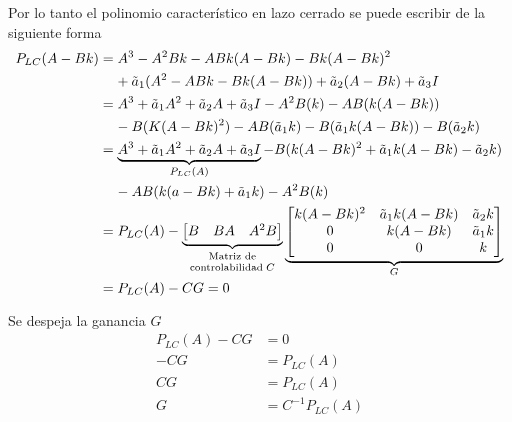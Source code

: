 Por lo tanto el polinomio característico en lazo cerrado se puede escribir de la siguiente forma
\[
    \begin{split}
            P_{LC}(A-Bk) & = A^{3} - A^{2}Bk - ABk(A-Bk) - Bk(A-Bk)^{2} \\ & \;\;\;\; + \tilde{a}_{1}( A^{2} - ABk - Bk(A-Bk) ) + \tilde{a}_{2}(A-Bk) + \tilde{a}_{3}I \\
            & = A^{3} + \tilde{a}_{1}A^{2} + \tilde{a}_{2}A + \tilde{a}_{3}I - A^{2}B(k) - AB(k(A-Bk)) \\
            & \;\;\;\; - B(K(A-Bk)^{2}) - AB(\tilde{a}_{1}k) - B(\tilde{a}_{1}k(A-Bk)) - B(\tilde{a}_{2}k) \\
            & = \underbrace{A^{3} + \tilde{a}_{1}A^{2} + \tilde{a}_{2}A + \tilde{a}_{3}I}_{ P_{LC}(A) } - B(k(A-Bk)^{2}+\tilde{a}_{1}k(A-Bk) - \tilde{a}_{2}k) \\ & \;\;\;\; - AB(k(a-Bk) + \tilde{a}_{1}k) - A^{2}B(k) \\
            & = P_{LC}(A) - 
            \underbrace{
                \begin{bmatrix}
                    B & BA & A^{2}B
                \end{bmatrix} 
                        }_
                        {
                        \begin{scriptsize}
                            \begin{matrix}
                                \text{Matriz de} \\
                                \text{controlabilidad} \; C
                            \end{matrix}
                        \end{scriptsize}
                        }
            \underbrace{
                \begin{bmatrix}
                    k(A-Bk)^{2} & \tilde{a}_{1}k(A-Bk) & \tilde{a}_{2}k \\
                    0 & k(A-Bk) & \tilde{a}_{1}k \\
                    0 & 0 & k
                \end{bmatrix}
                        }_{G} \\
            & = P_{LC}(A) - CG = 0
    \end{split}
\]

Se despeja la ganancia \( G \)
\[
    \begin{split}
        P_{LC}(A) - CG & = 0 \\
        -CG & = P_{LC}(A) \\
        CG & = P_{LC}(A) \\
        G & = C^{-1}P_{LC}(A)
    \end{split}
\]

